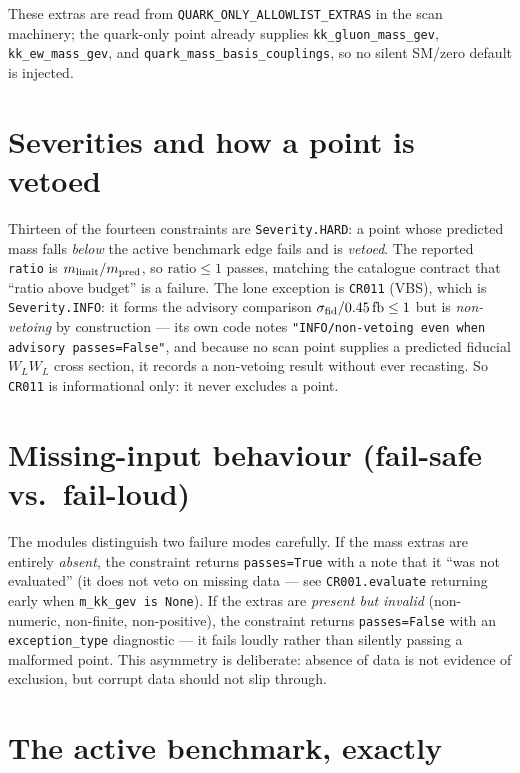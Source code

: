 \documentclass[11pt]{article}
\newcommand{\code}[1]{\texttt{#1}}
\theoremstyle{definition}
\begin{document}
These extras are read from \code{QUARK\_ONLY\_ALLOWLIST\_EXTRAS} in the scan
machinery; the quark-only point already supplies \code{kk\_gluon\_mass\_gev},
\code{kk\_ew\_mass\_gev}, and \code{quark\_mass\_basis\_couplings}, so no silent
SM/zero default is injected.

\section{Severities and how a point is vetoed}
\label{sec:severity}

Thirteen of the fourteen constraints are \code{Severity.HARD}: a point whose
predicted mass falls \emph{below} the active benchmark edge fails and is
\emph{vetoed}. The reported \code{ratio} is $m_{\rm limit}/m_{\rm pred}$, so
$\text{ratio} \le 1$ passes, matching the catalogue contract that ``ratio above
budget'' is a failure. The lone exception is \code{CR011} (VBS), which is
\code{Severity.INFO}: it forms the advisory comparison $\sigma_{\rm fid}/0.45\,
\text{fb} \le 1$ but is \emph{non-vetoing} by construction --- its own code notes
\code{"INFO/non-vetoing even when advisory passes=False"}, and because no scan
point supplies a predicted fiducial $W_L W_L$ cross section, it records a
non-vetoing result without ever recasting. So \code{CR011} is informational only:
it never excludes a point.

\section{Missing-input behaviour (fail-safe vs.\ fail-loud)}
\label{sec:missing}

The modules distinguish two failure modes carefully. If the mass extras are
entirely \emph{absent}, the constraint returns \code{passes=True} with a note
that it ``was not evaluated'' (it does not veto on missing data --- see
\code{CR001.evaluate} returning early when \code{m\_kk\_gev is None}). If the
extras are \emph{present but invalid} (non-numeric, non-finite, non-positive),
the constraint returns \code{passes=False} with an \code{exception\_type}
diagnostic --- it fails loudly rather than silently passing a malformed point.
This asymmetry is deliberate: absence of data is not evidence of exclusion, but
corrupt data should not slip through.

\section{The active benchmark, exactly}
\label{sec:active}
\end{document}
